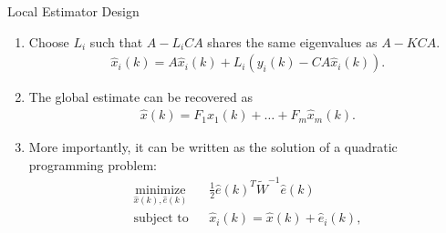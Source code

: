 \documentclass[10pt]{beamer}
\begin{document}
\begin{frame}{Local Estimator Design}
\begin{enumerate}
\item  Choose $L_i$ such that $A-L_iCA$ shares the same eigenvalues as $A-KCA$.
\begin{align*}
\hat x_i(k) = A \hat x_i(k) + L_i (y_i(k)-CA\hat x_i(k)).
\end{align*}  
\item The global estimate can be recovered as
\begin{align*}
\hat x(k) = F_1\hat x_1(k)+\dots+F_m\hat x_m(k).
\end{align*}
\item More importantly, it can be written as the solution of a quadratic programming problem:
\begin{align*}
  &\mathop{\textrm{minimize}}\limits_{\hat x(k),\hat e(k)}&
  & \frac{1}{2}\hat e(k)^T \tilde W^{-1} \hat e(k)\\
  &\textrm{subject to} &
  &\hat x_i(k)  =  \hat x(k) + \hat e_i(k),&
\end{align*}
\end{enumerate}
\end{frame}
\end{document}
